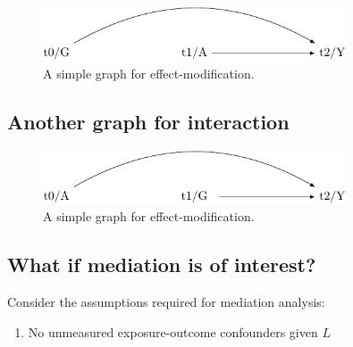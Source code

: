 \documentclass[
  singlecolumn]{report}
\providecommand{\tightlist}{%
  \setlength{\itemsep}{0pt}\setlength{\parskip}{0pt}}\usepackage{longtable,booktabs,array}
\begin{document}
\begin{figure}

{\centering \includegraphics[width=0.8\textwidth,height=\textheight]{causal-dags_files/figure-pdf/fig-dag-effect-modfication-1.pdf}

}

\caption{\label{fig-dag-effect-modfication}A simple graph for
effect-modification.}

\end{figure}

\hypertarget{another-graph-for-interaction}{%
\subsection{Another graph for
interaction}\label{another-graph-for-interaction}}

\begin{figure}

{\centering \includegraphics[width=0.8\textwidth,height=\textheight]{causal-dags_files/figure-pdf/fig-dag-effect-modfication-2-1.pdf}

}

\caption{\label{fig-dag-effect-modfication-2}A simple graph for
effect-modification.}

\end{figure}

\hypertarget{what-if-mediation-is-of-interest}{%
\subsection{What if mediation is of
interest?}\label{what-if-mediation-is-of-interest}}

Consider the assumptions required for mediation analysis:

\begin{enumerate}
\def\labelenumi{\arabic{enumi}.}
\tightlist
\item
  No unmeasured exposure-outcome confounders given \(L\)
\end{enumerate}
\end{document}
